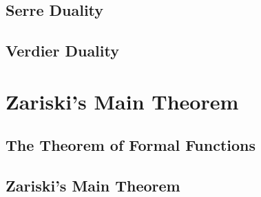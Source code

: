         \subsection{Serre Duality}

        \subsection{Verdier Duality}

    \section{Zariski's Main Theorem}
        \subsection{The Theorem of Formal Functions}

        \subsection{Zariski's Main Theorem}
    
    \printbibliography

